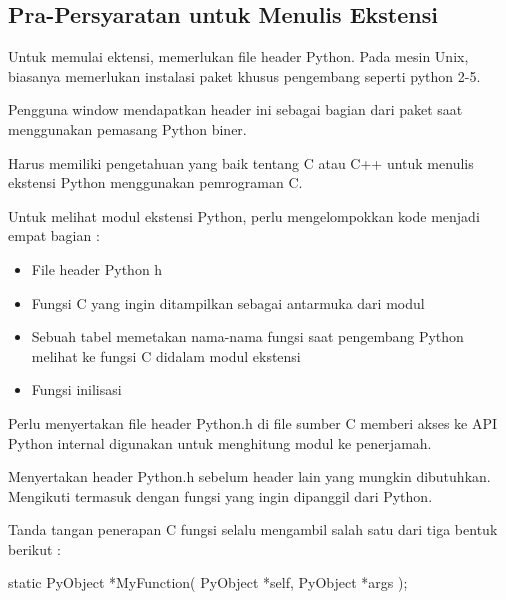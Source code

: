 \documentclass{wileySix}
\begin{document}
\begin{myEnumerate}
\begin{myEnumerate}
{\begin{myEnumerate}
\section{Pra-Persyaratan untuk Menulis Ekstensi}
 \par
\noindent 
\hspace*{0.5in} Untuk memulai ektensi, memerlukan file header Python. Pada mesin Unix, biasanya memerlukan instalasi paket khusus pengembang seperti python 2-5. \par
\noindent 
\hspace*{0.5in} Pengguna window mendapatkan header ini sebagai bagian dari paket saat menggunakan pemasang Python biner. \par
\noindent 
\hspace*{0.5in} Harus memiliki pengetahuan yang baik tentang C atau C++ untuk menulis ekstensi Python menggunakan pemrograman C. \par
\noindent 
\hspace*{0.5in} Untuk melihat modul ekstensi Python, perlu mengelompokkan kode menjadi empat bagian : \par
\noindent 
\begin{itemize}
	\item File header Python h \par
	\noindent 
	\item Fungsi C yang ingin ditampilkan sebagai antarmuka dari modul \par
	\noindent 
	\item Sebuah tabel memetakan nama-nama fungsi saat pengembang Python melihat ke fungsi C didalam modul ekstensi \par
	\noindent 
	\item Fungsi inilisasi\end{itemize}
\par
\vspace{12pt}
Perlu menyertakan file header Python.h di file sumber C memberi akses ke API Python internal digunakan untuk menghitung modul ke penerjamah. \par
Menyertakan header Python.h sebelum header lain yang mungkin dibutuhkan. Mengikuti termasuk dengan fungsi yang ingin dipanggil dari Python. \par
Tanda tangan penerapan C fungsi selalu mengambil salah satu dari tiga bentuk berikut : \par
\noindent 
{\fontsize{10pt}{10pt}\selectfont static PyObject *MyFunction( PyObject *self, PyObject *args );} \par
\noindent 

\end{myEnumerate}}
\end{myEnumerate}
\end{myEnumerate}
\end{document}

